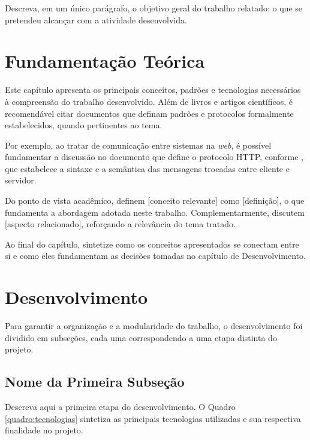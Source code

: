 \documentclass[
    12pt,
    openright,
    oneside,
    a4paper,
    brazil
]{abntex2}
\begin{document}
Descreva, em um único parágrafo, o objetivo geral do trabalho relatado: o que se pretendeu alcançar com a atividade desenvolvida.

\chapter{Fundamentação Teórica}

Este capítulo apresenta os principais conceitos, padrões e tecnologias necessários à compreensão do trabalho desenvolvido. Além de livros e artigos científicos, é recomendável citar documentos que definam padrões e protocolos formalmente estabelecidos, quando pertinentes ao tema.

Por exemplo, ao tratar de comunicação entre sistemas na \textit{web}, é possível fundamentar a discussão no documento que define o protocolo HTTP, conforme , que estabelece a sintaxe e a semântica das mensagens trocadas entre cliente e servidor.

Do ponto de vista acadêmico,  definem [conceito relevante] como [definição], o que fundamenta a abordagem adotada neste trabalho. Complementarmente,  discutem [aspecto relacionado], reforçando a relevância do tema tratado.

Ao final do capítulo, sintetize como os conceitos apresentados se conectam entre si e como eles fundamentam as decisões tomadas no capítulo de Desenvolvimento.

\chapter{Desenvolvimento}

Para garantir a organização e a modularidade do trabalho, o desenvolvimento foi dividido em subseções, cada uma correspondendo a uma etapa distinta do projeto.

\section{Nome da Primeira Subseção}

Descreva aqui a primeira etapa do desenvolvimento. O Quadro \ref{quadro:tecnologias} sintetiza as principais tecnologias utilizadas e sua respectiva finalidade no projeto.
\end{document}

